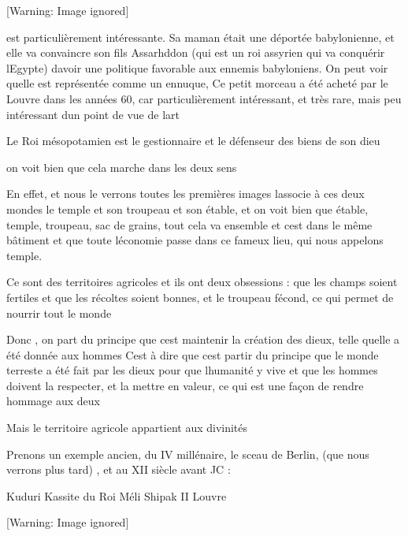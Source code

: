 \documentclass{article}
\begin{document}
  [Warning: Image ignored] %
 

est particulièrement intéressante. Sa maman était une déportée
babylonienne, et elle va convaincre son fils Assarhddon (qui est un roi
assyrien qui va conquérir l{\textquotesingle}Egypte)
d{\textquotesingle}avoir une politique favorable aux ennemis
babyloniens. On peut voir qu{\textquotesingle}elle est représentée
comme un ennuque,  Ce petit morceau a été acheté par le Louvre dans les
années 60, car particulièrement intéressant, et très rare, mais peu
intéressant d{\textquotesingle}un point de vue de
l{\textquotesingle}art

Le Roi mésopotamien est le gestionnaire et le défenseur des biens de son
dieu

on voit bien que cela marche dans les deux sens

En effet, et nous le verrons toutes les  premières  images
l{\textquotesingle}associe à ces deux mondes le temple et son troupeau
et son étable,  et on voit bien que étable, temple, troupeau, sac de
grains, tout cela va ensemble et c{\textquotesingle}est dans le même
bâtiment  et que toute l{\textquotesingle}économie passe dans ce fameux
lieu, qui nous appelons temple.

Ce sont des territoires agricoles et ils ont deux obsessions  : que les
champs soient fertiles et que les récoltes soient bonnes, et le
troupeau fécond, ce qui permet de nourrir tout le monde

Donc , on part du principe que c{\textquotesingle}est maintenir la
création des dieux, telle qu{\textquotesingle}elle a été donnée aux
hommes C{\textquotesingle}est à dire que c{\textquotesingle}est partir
du principe que le monde terreste a été fait par les dieux pour que
l{\textquotesingle}humanité y vive et que les hommes doivent la
respecter, et la mettre en valeur, ce qui est une façon de rendre
hommage aux deux

Mais le territoire agricole appartient aux divinités

Prenons un exemple ancien, du IV millénaire, le sceau de Berlin, (que
nous verrons plus tard) , et au XII siècle avant JC :

Kuduri Kassite du Roi Méli Shipak II  Louvre

  [Warning: Image ignored] %
 
\end{document}
